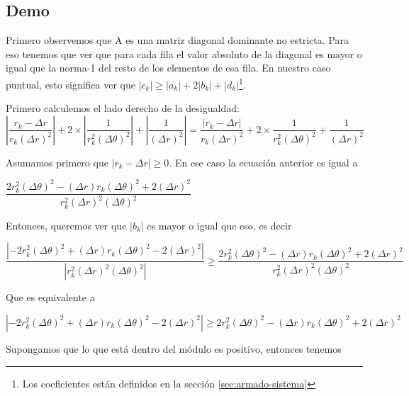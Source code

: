 \subsection{Demo}
Primero observemos que A es una matriz diagonal dominante no estricta. Para eso tenemos que ver que para cada fila el valor absoluto de la diagonal es mayor o igual que la norma-1 del resto de los elementos de esa fila. En nuestro caso puntual, esto significa ver que 
$|c_k| \geq |a_k| + 2|b_k| + |d_k|$\footnote{Los coeficientes están definidos en la sección \ref{sec:armado-sistema}}.

Primero calculemos el lado derecho de la desigualdad:
\begin{equation*}
\left\vert \dfrac{r_k - \Delta r}{r_k (\Delta r)^2}\right\vert +
2 \times \left\vert \dfrac{1}{r_k^2(\Delta \theta)^2} \right\vert+
\left\vert \dfrac{1}{(\Delta r)^2} \right\vert = 
\dfrac{\left\vert r_k - \Delta r \right\vert}{r_k (\Delta r)^2} +
2 \times \dfrac{1}{r_k^2(\Delta \theta)^2} +
\dfrac{1}{(\Delta r)^2}
\end{equation*}

Asumamos primero que $\left\vert r_k - \Delta r \right\vert \geq 0$. En ese caso la ecuación anterior es igual a
 
\begin{center}
$\dfrac{2 r_k^2 (\Delta \theta)^2 - (\Delta r) r_k (\Delta \theta)^2 + 2 (\Delta r)^2}{r_k^2 (\Delta r)^2 (\Delta \theta)^2}$
\end{center}

Entonces, queremos ver que $|b_k|$ es mayor o igual que eso, es decir

\begin{equation*}
\dfrac{\left\vert -2 r_k^2 (\Delta \theta)^2 + (\Delta r) r_k (\Delta \theta)^2 - 2 (\Delta r)^2 \right\vert } 
{\left\vert r_k^2 (\Delta r)^2 (\Delta \theta)^2 \right\vert } \geq
\dfrac{2 r_k^2 (\Delta \theta)^2 - (\Delta r) r_k (\Delta \theta)^2 + 2 (\Delta r)^2}{r_k^2 (\Delta r)^2 (\Delta \theta)^2}
\end{equation*}

Que es equivalente a

\begin{equation*}
\left\vert -2 r_k^2 (\Delta \theta)^2 + (\Delta r) r_k (\Delta \theta)^2 - 2 (\Delta r)^2 \right\vert \geq
2 r_k^2 (\Delta \theta)^2 - (\Delta r) r_k (\Delta \theta)^2 + 2 (\Delta r)^2
\end{equation*}

Supongamos que lo que está dentro del módulo es positivo, entonces tenemos

